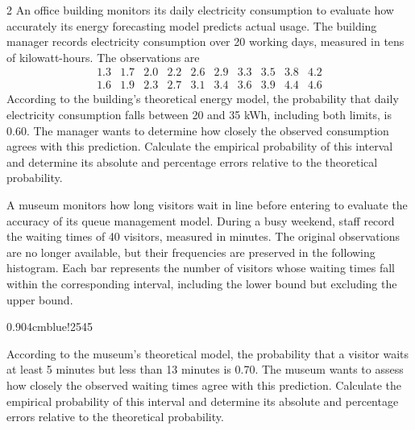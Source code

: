 \begin{multicols}{2}
\label{sec:c6-2}
An office building monitors its daily electricity consumption to evaluate
how accurately its energy forecasting model predicts actual usage.
The building manager records electricity consumption over 20 working days,
measured in tens of kilowatt-hours. The observations are
\[
\begin{array}{cccccccccc}
	1.3&1.7&2.0&2.2&2.6&2.9&3.3&3.5&3.8&4.2\\
	1.6&1.9&2.3&2.7&3.1&3.4&3.6&3.9&4.4&4.6
\end{array}
\]
According to the building's theoretical energy model, the probability
that daily electricity consumption falls between 20 and 35 kWh,
including both limits, is 0.60. The manager wants to determine how
closely the observed consumption agrees with this prediction.
Calculate the empirical probability of this interval and determine
its absolute and percentage errors relative to the theoretical probability.


\label{sec:c6-3}
A museum monitors how long visitors wait in line before entering
to evaluate the accuracy of its queue management model.
During a busy weekend, staff record the waiting times of 40 visitors,
measured in minutes. The original observations are no longer available,
but their frequencies are preserved in the following histogram.
Each bar represents the number of visitors whose waiting times fall
within the corresponding interval, including the lower bound but
excluding the upper bound.
\begin{center}
	{0.90\linewidth}{4cm}{blue!25}{4}{5}
\end{center}\vspace{-4mm}
According to the museum's theoretical model, the probability that
a visitor waits at least 5 minutes but less than 13 minutes is 0.70.
The museum wants to assess how closely the observed waiting times
agree with this prediction. Calculate the empirical probability
of this interval and determine its absolute and percentage errors
relative to the theoretical probability. 



\end{multicols}

